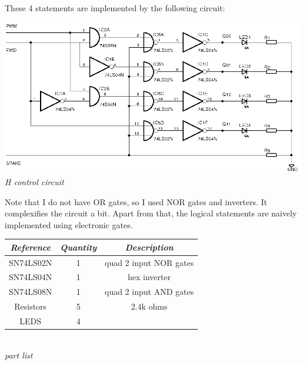 \documentclass[12pt]{article}
\begin{document}
\smallskip
\pagebreak
These 4 statements are implemented by the following circuit:
\begin{center}
  \includegraphics[keepaspectratio=true, width=1.\textwidth]{../pics/h_control.png}
  \\
  \smallskip
  \tiny{\textit{H control circuit}}
\end{center}

Note that I do not have OR gates, so I used NOR gates and inverters. It complexifies the circuit a bit.
Apart from that, the logical statements are naively implemented using electronic gates.

\smallskip
\begin{center}
  \begin{tabular}{|c|c|c|}
    \hline
    \textit{Reference} & \textit{Quantity} & \textit{Description} \\
    \hline
    SN74LS02N & 1 & quad 2 input NOR gates \\
    \hline
    SN74LS04N & 1 & hex inverter \\
    \hline
    SN74LS08N & 1 & quad 2 input AND gates \\
    \hline
    Resistors & 5 & 2.4k ohms \\
    \hline
    LEDS & 4 & \\
    \hline
  \end{tabular}
  \\
  \smallskip
  \tiny{\textit{part list}}
\end{center}
\end{document}
